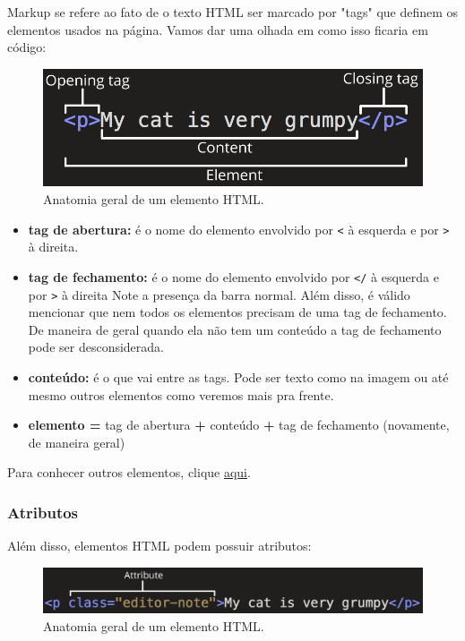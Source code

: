 \documentclass{article}
\begin{document}
Markup se refere ao fato de o texto HTML ser marcado por "tags" que definem os elementos usados 
na página. Vamos dar uma olhada em como isso ficaria em código:

\begin{figure}[h!]
    \centering
    \includegraphics[scale=.4]{imgs/element-anatomy.png}
    \caption{Anatomia geral de um elemento HTML.}
    \label{fig:element-anatomy}
\end{figure}


\begin{itemize}
\item
  \textbf{tag de abertura:} é o nome do elemento envolvido por
  \texttt{\textless{}} à esquerda e por \texttt{\textgreater{}} à
  direita.
\item
  \textbf{tag de fechamento:} é o nome do elemento envolvido por
  \texttt{\textless{}/} à esquerda e por \texttt{\textgreater{}} à
  direita Note a presença da barra normal. Além disso, é válido
  mencionar que nem todos os elementos precisam de uma tag de
  fechamento. De maneira de geral quando ela não tem um conteúdo a tag
  de fechamento pode ser desconsiderada.
\item
  \textbf{conteúdo:} é o que vai entre as tags. Pode ser texto como na
  imagem ou até mesmo outros elementos como veremos mais pra frente.
\item
  \textbf{elemento =} tag de abertura \textbf{+} conteúdo \textbf{+} tag
  de fechamento (novamente, de maneira geral)
\end{itemize}

Para conhecer outros elementos, clique
\href{https://developer.mozilla.org/en-US/docs/Web/HTML/Element}{aqui}.


\subsubsection{Atributos}
Além disso, elementos HTML podem possuir atributos:

\begin{figure}[h!]
    \centering
    \includegraphics[scale=.3]{imgs/attrs.png}
    \caption{Anatomia geral de um elemento HTML.}
    \label{fig:attrs}
\end{figure}
\end{document}
